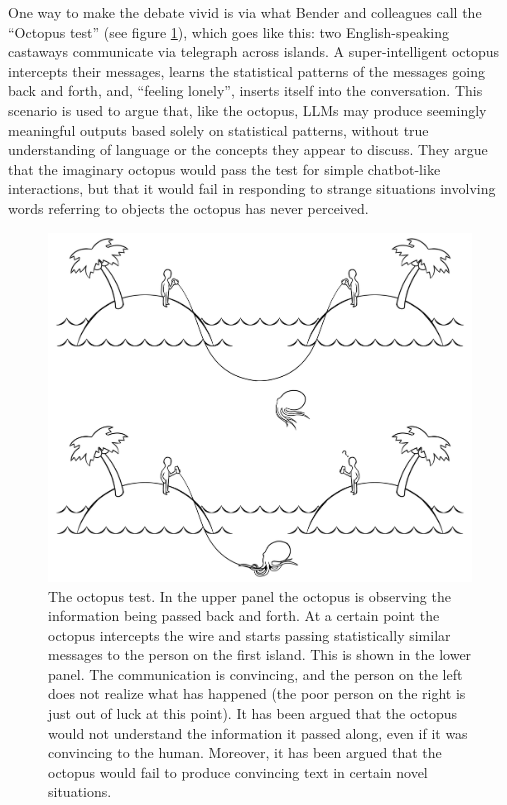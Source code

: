 One way to make the debate vivid is via what Bender and colleagues call the
``Octopus test'' \cite{bender2020climbing} (see figure \ref{octopusTest}),
which goes like this: two English-speaking castaways communicate via telegraph
across islands. A super-intelligent octopus intercepts their messages, learns
the statistical patterns of the messages going back and forth, and, ``feeling
lonely'', inserts itself into the conversation. This scenario is used to argue
that, like the octopus, LLMs may produce seemingly meaningful outputs based
solely on statistical patterns, without true understanding of language or the
concepts they appear to discuss. They argue that the imaginary octopus would
pass the test for simple chatbot-like interactions, but that it would fail in
responding to strange situations involving words referring to objects the
octopus has never perceived. 

\begin{figure}[ht]
\centering
\includegraphics[scale=.20]{./images/octopusTest.png}
\caption[Soraya Boza.]{The octopus test. In the upper panel the octopus is
observing the information being passed back and forth. At a certain point the
octopus intercepts the wire and starts passing statistically similar messages
to the person on the first island. This is shown in the lower panel. The
communication is convincing, and the person on the left does not realize what
has happened (the poor person on the right is just out of luck at this point).
It has been argued that the octopus would not understand the information it
passed along, even if it was convincing to the human. Moreover, it has been
argued that the octopus would fail to produce convincing text in certain novel
situations.
}
\label{octopusTest}
\end{figure}


